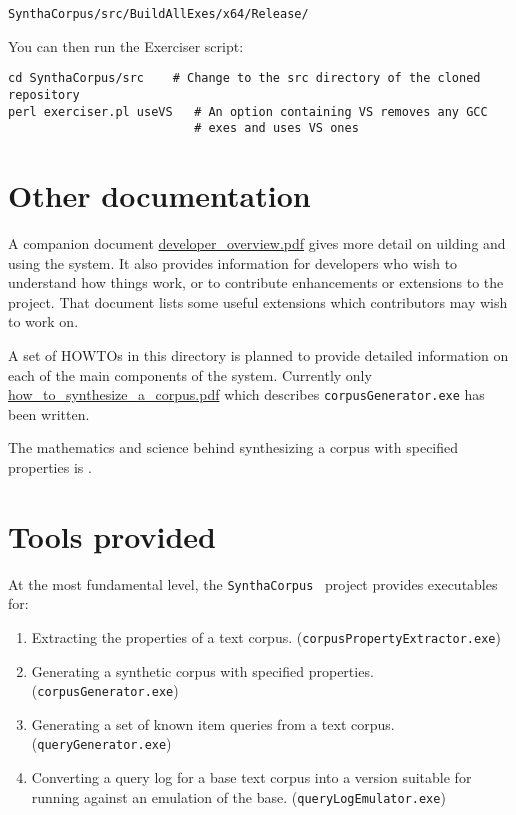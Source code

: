 \documentclass{article}
\newcommand{\red}[1]{{\color{red}{\emph{#1}}}}
\newcommand{\projectName}{\texttt{SynthaCorpus}}
\begin{document}
\begin{verbatim}
SynthaCorpus/src/BuildAllExes/x64/Release/
\end{verbatim}

You can then run the Exerciser script:
\begin{verbatim}
cd SynthaCorpus/src    # Change to the src directory of the cloned repository
perl exerciser.pl useVS   # An option containing VS removes any GCC
                          # exes and uses VS ones
\end{verbatim}



\section{Other documentation}
A companion document \url{developer_overview.pdf} gives more detail on 
uilding and using the system.  It also provides
information for developers who wish to understand how things work, or
to contribute enhancements or extensions to the project.  That
document lists some useful extensions which contributors may wish to
work on.

A set of HOWTOs in this directory is planned to  provide detailed
information on each of the main components of the system.  Currently
only \url{how_to_synthesize_a_corpus.pdf} which describes
\verb|corpusGenerator.exe| has been written.

The mathematics and science behind synthesizing a corpus with
specified properties is \red{described
  elsewhere}.


\section{Tools provided}

At the most fundamental level, the \projectName~ project provides executables for:
\begin{enumerate}
\item Extracting the properties of a text corpus. (\texttt{corpusPropertyExtractor.exe})
\item Generating a synthetic corpus with specified properties. (\texttt{corpusGenerator.exe})
\item Generating a set of known item queries from a text corpus. (\texttt{queryGenerator.exe})
\item Converting a query log for a base text corpus into a 
  version suitable for running against an emulation of the base. (\texttt{queryLogEmulator.exe})
\end{enumerate}
\end{document}
